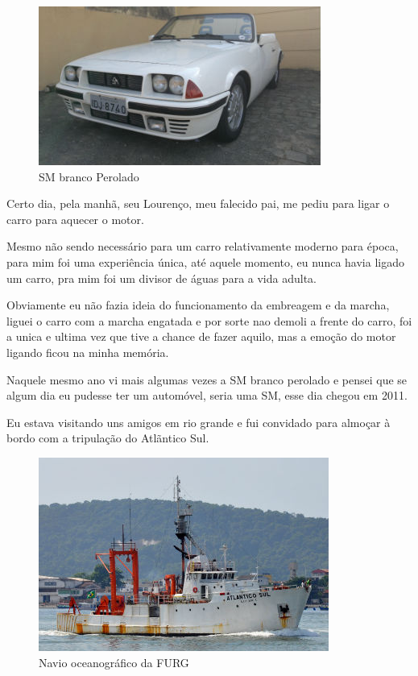 \documentclass[a4paper]{report}
\begin{document}
\begin{figure}[!htb]
\centering
\includegraphics{sm_bco_per}
\caption{SM branco Perolado}
\label{sm_bco}
\end{figure}

Certo dia, pela manh\~a, seu Louren\c{c}o, meu falecido pai, me pediu para ligar o carro para aquecer o motor.

Mesmo n\~ao sendo necess\'ario para um carro relativamente moderno para \'epoca, para mim foi uma experi\^encia \'unica,
at\'e aquele momento, eu nunca havia ligado um carro, pra mim foi um divisor de \'aguas para a vida adulta.

Obviamente eu n\~ao fazia ideia do funcionamento da embreagem e da marcha, liguei o carro com a marcha engatada e por sorte
nao demoli a frente do carro, foi a unica e ultima vez que tive a chance de fazer aquilo, mas a emo\c{c}\~ao do motor ligando ficou
na minha mem\'oria. 

Naquele mesmo ano vi mais algumas vezes a SM branco perolado e pensei que se algum dia eu pudesse ter um
autom\'ovel, seria uma SM, esse dia chegou em 2011.

Eu estava visitando uns amigos em rio grande e fui convidado para almo\c{c}ar \`a bordo com a tripula\c{c}\~ao do Atl\~antico Sul.

\begin{figure}[!htb]
\centering
\includegraphics{atsul}
\caption{Navio oceanogr\'afico da FURG}
\label{at_sul}
\end{figure}
\end{document}
